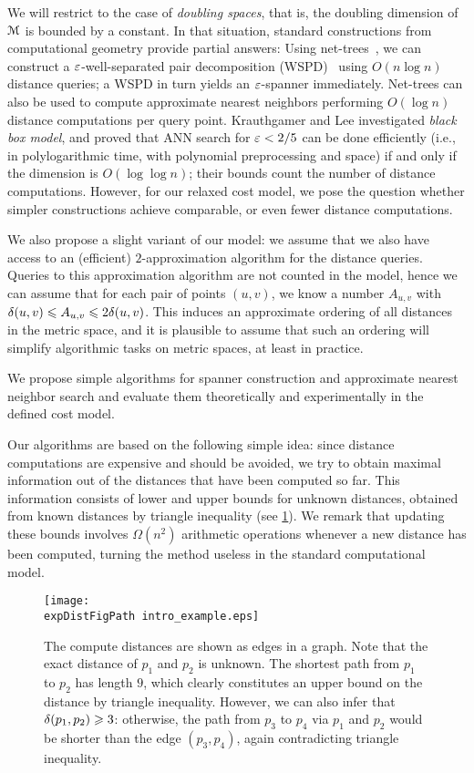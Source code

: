 \documentclass[a4paper,UKenglish,cleveref, autoref]{lipics-v2019}
\def \expDistFigPath {pics/}
\begin{document}
We will restrict to the case of \emph{doubling spaces}, that is, the doubling dimension
of $\mathcal{M}$ is bounded by a constant. 
In that situation, standard constructions from computational geometry provide partial answers:
Using net-trees~\cite{hm-fast}, we can construct a $\varepsilon$-well-separated pair decomposition (WSPD)~\cite{CK-decomposition} using $O(n\log n)$ distance queries; a WSPD in turn yields
an $\varepsilon$-spanner immediately. Net-trees can also be used to compute approximate nearest neighbors
performing $O(\log n)$ distance computations per query point.
Krauthgamer and Lee \cite{krauthgamer2005black} investigated \textit{black box model},
and proved that ANN search for $\varepsilon < 2/5$ can be done efficiently (i.e., in polylogarithmic time, with polynomial preprocessing
and space) if and only if the dimension is $O(\log \log n)$; their bounds count the number of distance computations.
However, for our relaxed cost model, we pose the question whether simpler constructions achieve
comparable, or even fewer distance computations.

We also propose a slight variant of our model: we assume that we also have access to an (efficient)
$2$-approximation algorithm for the distance queries. Queries to this approximation algorithm
are not counted in the model, hence we can assume that for each pair of points $(u,v)$, we
know a number $A_{u,v}$ with $\delta(u,v)\leqslant A_{u,v}\leqslant 2\delta(u,v)$. This induces an approximate ordering
of all distances in the metric space, and it is plausible to assume that such an ordering will simplify
algorithmic tasks on metric spaces, at least in practice.

%
We propose simple algorithms for spanner construction and approximate nearest neighbor search
and evaluate them theoretically and experimentally in the defined cost model.

Our algorithms are based on the following simple idea: since distance computations are expensive
and should be avoided, we try to obtain maximal information out of the distances that have been computed
so far. 
This information consists of lower and upper bounds for unknown distances, obtained from known distances
by triangle inequality (see \cref{fig:1st_example}). We remark that updating these bounds involves $\Omega(n^2)$ arithmetic
operations whenever a new distance has been computed, turning the method useless in the standard computational model.

\begin{figure}[h]
\centering
\texttt{[image: \\expDistFigPath  intro\_example.eps]}
\caption{The compute distances are shown as edges in a graph. Note that the exact distance
of $p_1$ and $p_2$ is unknown. The shortest path from $p_1$ to $p_2$ has length $9$, which clearly
constitutes an upper bound on the distance by triangle inequality.
However, we can also infer that $\delta(p_1,p_2)\geqslant 3$:
otherwise, the path from $p_3$ to $p_4$ via $p_1$ and $p_2$
would be shorter than the edge $(p_3,p_4)$, again contradicting
triangle inequality.}
\label{fig:1st_example}
\end{figure}
\end{document}
